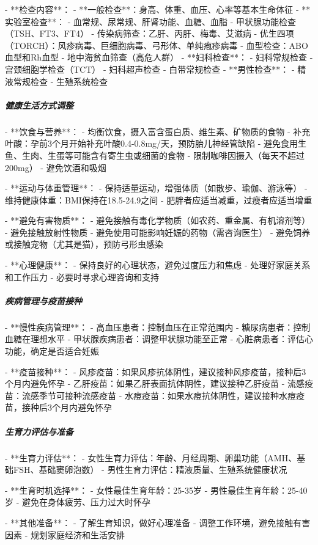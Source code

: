 \begin{enumerate}
- **检查内容**：
  - **一般检查**：身高、体重、血压、心率等基本生命体征
  - **实验室检查**：
    - 血常规、尿常规、肝肾功能、血糖、血脂
    - 甲状腺功能检查（TSH、FT3、FT4）
    - 传染病筛查：乙肝、丙肝、梅毒、艾滋病
    - 优生四项（TORCH）：风疹病毒、巨细胞病毒、弓形体、单纯疱疹病毒
    - 血型检查：ABO血型和Rh血型
    - 地中海贫血筛查（高危人群）
  - **妇科检查**：
    - 妇科常规检查
    - 宫颈细胞学检查（TCT）
    - 妇科超声检查
    - 白带常规检查
  - **男性检查**：
    - 精液常规检查
    - 生殖系统检查

\subparagraph{健康生活方式调整}

- **饮食与营养**：
  - 均衡饮食，摄入富含蛋白质、维生素、矿物质的食物
  - 补充叶酸：孕前3个月开始补充叶酸0.4-0.8mg/天，预防胎儿神经管缺陷
  - 避免食用生鱼、生肉、生蛋等可能含有寄生虫或细菌的食物
  - 限制咖啡因摄入（每天不超过200mg）
  - 避免饮酒和吸烟

- **运动与体重管理**：
  - 保持适量运动，增强体质（如散步、瑜伽、游泳等）
  - 维持健康体重：BMI保持在18.5-24.9之间
  - 肥胖者应适当减重，过瘦者应适当增重

- **避免有害物质**：
  - 避免接触有毒化学物质（如农药、重金属、有机溶剂等）
  - 避免接触放射性物质
  - 避免使用可能影响妊娠的药物（需咨询医生）
  - 避免饲养或接触宠物（尤其是猫），预防弓形虫感染

- **心理健康**：
  - 保持良好的心理状态，避免过度压力和焦虑
  - 处理好家庭关系和工作压力
  - 必要时寻求心理咨询和支持

\subparagraph{疾病管理与疫苗接种}

- **慢性疾病管理**：
  - 高血压患者：控制血压在正常范围内
  - 糖尿病患者：控制血糖在理想水平
  - 甲状腺疾病患者：调整甲状腺功能至正常
  - 心脏病患者：评估心功能，确定是否适合妊娠

- **疫苗接种**：
  - 风疹疫苗：如果风疹抗体阴性，建议接种风疹疫苗，接种后3个月内避免怀孕
  - 乙肝疫苗：如果乙肝表面抗体阴性，建议接种乙肝疫苗
  - 流感疫苗：流感季节可接种流感疫苗
  - 水痘疫苗：如果水痘抗体阴性，建议接种水痘疫苗，接种后3个月内避免怀孕

\subparagraph{生育力评估与准备}

- **生育力评估**：
  - 女性生育力评估：年龄、月经周期、卵巢功能（AMH、基础FSH、基础窦卵泡数）
  - 男性生育力评估：精液质量、生殖系统健康状况

- **生育时机选择**：
  - 女性最佳生育年龄：25-35岁
  - 男性最佳生育年龄：25-40岁
  - 避免在身体疲劳、压力过大时怀孕

- **其他准备**：
  - 了解生育知识，做好心理准备
  - 调整工作环境，避免接触有害因素
  - 规划家庭经济和生活安排


\end{enumerate}
